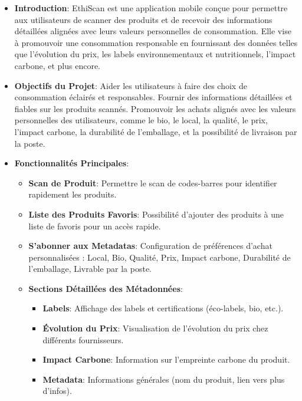 \documentclass[11pt]{article}
\begin{document}
\begin{itemize}
    \item \textbf{Introduction}: EthiScan est une application mobile conçue pour permettre aux utilisateurs de scanner des produits et de recevoir des informations détaillées alignées avec leurs valeurs personnelles de consommation. Elle vise à promouvoir une consommation responsable en fournissant des données telles que l'évolution du prix, les labels environnementaux et nutritionnels, l'impact carbone, et plus encore.
    \item \textbf{Objectifs du Projet}: Aider les utilisateurs à faire des choix de consommation éclairés et responsables. Fournir des informations détaillées et fiables sur les produits scannés. Promouvoir les achats alignés avec les valeurs personnelles des utilisateurs, comme le bio, le local, la qualité, le prix, l'impact carbone, la durabilité de l'emballage, et la possibilité de livraison par la poste.
    \item \textbf{Fonctionnalités Principales}:
          \begin{itemize}
              \item \textbf{Scan de Produit}: Permettre le scan de codes-barres pour identifier rapidement les produits.
              \item \textbf{Liste des Produits Favoris}: Possibilité d'ajouter des produits à une liste de favoris pour un accès rapide.
              \item \textbf{S'abonner aux Metadatas}: Configuration de préférences d'achat personnalisées : Local, Bio, Qualité, Prix, Impact carbone, Durabilité de l'emballage, Livrable par la poste.
              \item \textbf{Sections Détaillées des Métadonnées}:
                    \begin{itemize}
                        \item \textbf{Labels}: Affichage des labels et certifications (éco-labels, bio, etc.).
                        \item \textbf{Évolution du Prix}: Visualisation de l'évolution du prix chez différents fournisseurs.
                        \item \textbf{Impact Carbone}: Information sur l'empreinte carbone du produit.
                        \item \textbf{Metadata}: Informations générales (nom du produit, lien vers plus d'infos).
                    \end{itemize}
          \end{itemize}

\end{itemize}
\end{document}
